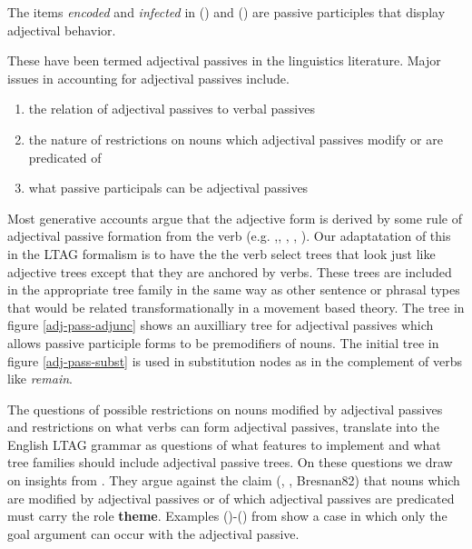   The items {\it  encoded} and {\it infected} in () and () are passive participles that display adjectival behavior.  


These have been termed adjectival passives in the linguistics literature.  Major issues in accounting for adjectival passives include. 

\begin{enumerate}
\item  the relation of adjectival passives to verbal passives
\item  the nature of restrictions on nouns which adjectival passives modify or are predicated of
\item  what passive participals can be adjectival passives
\end{enumerate}

Most generative accounts argue that the adjective form is derived by some rule of adjectival passive formation from the verb (e.g. \cite{Seigel73},\cite{Wasow77}, \cite{Williams81}, \cite{Bresnan82}, \cite{LevinRap}).  Our adaptatation of this in the LTAG formalism is to have the the verb select trees that look just like adjective trees except that they are anchored by verbs.  These trees are included in the appropriate tree family in the same way as other sentence or phrasal types  that would be related transformationally in a movement based theory.   The tree in figure \ref{adj-pass-adjunc} shows an auxilliary tree for adjectival passives which allows passive participle forms to be premodifiers of nouns.  The initial tree in figure \ref{adj-pass-subst} is used in substitution nodes as in the complement of verbs like {\it remain}.

\begin{figure}[h]
\end{figure}

\begin{figure}[h]
\end{figure}

The questions of possible restrictions on nouns modified by adjectival passives and restrictions on what verbs can form adjectival passives, translate into the English LTAG grammar as questions of what features to implement and what tree families should include adjectival passive trees.  On these questions we draw on insights from \cite{LevinRap}.  They argue against the claim (\cite{Wasow80}, \cite{Williams81}, {Bresnan82}) that nouns which are modified by adjectival passives or of which adjectival passives are predicated must carry the role {\bf theme}.  Examples ()-() from \cite{LevinRap} show a case in which only the goal argument can occur with the adjectival passive.  

